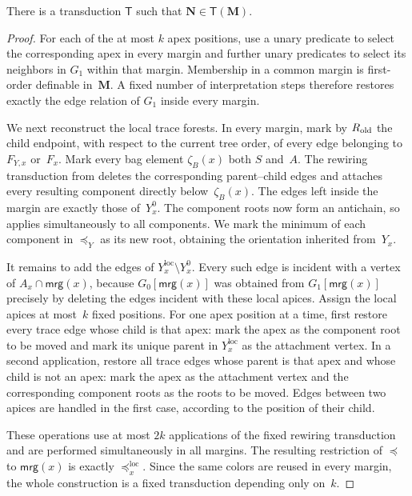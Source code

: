 \documentclass[1p,number,11pt]{elsarticle}
\theoremstyle{plain}
\newcommand{\mrg}{\mathsf{mrg}}
\begin{document}
\begin{lemma}
There is a transduction $\mathsf T$ such that
$\mathbf N\in\mathsf T(\mathbf M)$.
\end{lemma}
\begin{proof}
For each of the at most $k$ apex positions, use a unary predicate to select the
corresponding apex in every margin and further unary predicates to select its
neighbors in $G_1$ within that margin.  Membership in a common margin is
first-order definable in~$\mathbf M$.  A fixed number of interpretation steps
therefore restores exactly the edge relation of $G_1$ inside every margin.

We next reconstruct the local trace forests.
In every margin, mark by $R_{\rm old}$ the child endpoint, with respect to the current tree order, of every edge belonging to $F_{Y,x}$ or~$F_x$.
Mark every bag element $\zeta_B(x)$ both $S$ and~$A$.
The rewiring transduction from  deletes the corresponding parent--child edges and attaches every resulting component directly below~$\zeta_B(x)$.
The edges left inside the margin are exactly those of~$Y_x^0$.
The component roots now form an antichain, so  applies simultaneously to all components.
We mark the minimum of each component in $\preceq_Y$ as its new root, obtaining the orientation inherited from~$Y_x$.

It remains to add the edges of
$Y_x^{\mathrm{loc}}\setminus Y_x^0$.
Every such edge is incident with a vertex of $A_x\cap\mrg(x)$, because
$G_0[\mrg(x)]$ was obtained from $G_1[\mrg(x)]$ precisely by deleting the
edges incident with these local apices.  Assign the local apices at most~$k$
fixed positions.  For one apex position at a time, first restore every trace
edge whose child is that apex: mark the apex as the component root to be
moved and mark its unique parent in $Y_x^{\mathrm{loc}}$ as the attachment
vertex.  In a second application, restore all trace edges whose parent is
that apex and whose child is not an apex: mark the apex as the attachment
vertex and the corresponding component roots as the roots to be moved.
Edges between two apices are handled in the first case, according to the
position of their child.

These operations use at most $2k$ applications of the fixed rewiring
transduction and are performed simultaneously in all margins.  The resulting
restriction of $\preceq$ to $\mrg(x)$ is exactly
$\preceq_x^{\mathrm{loc}}$.  Since the same colors are reused in every
margin, the whole construction is a fixed transduction depending only
on~$k$.
\end{proof}
\end{document}
